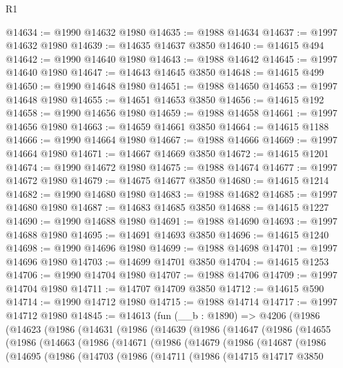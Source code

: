 \begin{lexlean}{R1}
\begin{coremodule}
@14634 := @1990 @14632 @1980
@14635 := @1988 @14634
@14637 := @1997 @14632 @1980
@14639 := @14635 @14637 @3850
@14640 := @14615 @494
@14642 := @1990 @14640 @1980
@14643 := @1988 @14642
@14645 := @1997 @14640 @1980
@14647 := @14643 @14645 @3850
@14648 := @14615 @499
@14650 := @1990 @14648 @1980
@14651 := @1988 @14650
@14653 := @1997 @14648 @1980
@14655 := @14651 @14653 @3850
@14656 := @14615 @192
@14658 := @1990 @14656 @1980
@14659 := @1988 @14658
@14661 := @1997 @14656 @1980
@14663 := @14659 @14661 @3850
@14664 := @14615 @1188
@14666 := @1990 @14664 @1980
@14667 := @1988 @14666
@14669 := @1997 @14664 @1980
@14671 := @14667 @14669 @3850
@14672 := @14615 @1201
@14674 := @1990 @14672 @1980
@14675 := @1988 @14674
@14677 := @1997 @14672 @1980
@14679 := @14675 @14677 @3850
@14680 := @14615 @1214
@14682 := @1990 @14680 @1980
@14683 := @1988 @14682
@14685 := @1997 @14680 @1980
@14687 := @14683 @14685 @3850
@14688 := @14615 @1227
@14690 := @1990 @14688 @1980
@14691 := @1988 @14690
@14693 := @1997 @14688 @1980
@14695 := @14691 @14693 @3850
@14696 := @14615 @1240
@14698 := @1990 @14696 @1980
@14699 := @1988 @14698
@14701 := @1997 @14696 @1980
@14703 := @14699 @14701 @3850
@14704 := @14615 @1253
@14706 := @1990 @14704 @1980
@14707 := @1988 @14706
@14709 := @1997 @14704 @1980
@14711 := @14707 @14709 @3850
@14712 := @14615 @590
@14714 := @1990 @14712 @1980
@14715 := @1988 @14714
@14717 := @1997 @14712 @1980
@14845 := @14613
    (fun (__b : @1890) =>
    @4206
      (@1986
        (@14623
          (@1986
            (@14631
              (@1986
                (@14639
                  (@1986
                    (@14647
                      (@1986
                        (@14655
                          (@1986
                            (@14663
                              (@1986
                                (@14671
                                  (@1986
                                    (@14679
                                      (@1986
                                        (@14687
                                          (@1986
                                            (@14695
                                              (@1986
                                                (@14703
                                                  (@1986
                                                    (@14711
                                                      (@1986
                                                        (@14715
                                                          @14717
                                                          @3850

\end{coremodule}
\end{lexlean}

